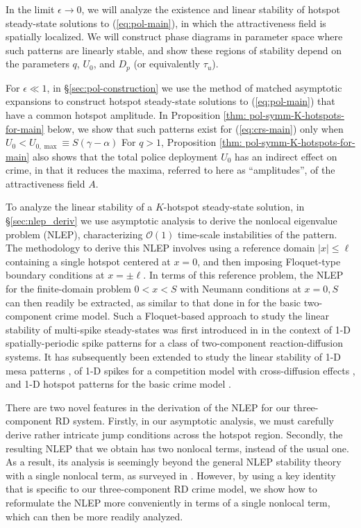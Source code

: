 \documentclass{article}%
\begin{document}
In the limit $\epsilon\to 0$, we will analyze the existence and
linear stability of hotspot steady-state solutions to
(\ref{eq:pol-main}), in which the attractiveness field is spatially
localized. We will construct phase diagrams in parameter space where
such patterns are linearly stable, and show these regions of stability
depend on the parameters $q$, $U_0$, and $D_p$ (or equivalently
$\tau_u$).

For $\epsilon\ll 1$, in \S \ref{sec:pol-construction} we use the
method of matched asymptotic expansions to construct hotspot
steady-state solutions to (\ref{eq:pol-main}) that have a common
hotspot amplitude. In Proposition \ref{thm:
  pol-symm-K-hotspots-for-main} below, we show that such patterns exist for
(\ref{eq:crs-main}) only when $U_0<U_{0,\max}\equiv S(\gamma-\alpha)$
For $q>1$, Proposition \ref{thm: pol-symm-K-hotspots-for-main} also shows
that the total police deployment $U_0$ has an indirect effect on
crime, in that it reduces the maxima, referred to here as
``amplitudes'', of the attractiveness field $A$.

To analyze the linear stability of a $K$-hotspot steady-state
solution, in \S \ref{sec:nlep_deriv} we use asymptotic analysis to
derive the nonlocal eigenvalue problem (NLEP), characterizing
${\mathcal O}(1)$ time-scale instabilities of the pattern. The
methodology to derive this NLEP involves using a reference domain
$|x|\leq \ell$ containing a single hotspot centered at $x=0$, and
then imposing Floquet-type boundary conditions at $x=\pm \ell$.  In
terms of this reference problem, the NLEP for the finite-domain
problem $0<x<S$ with Neumann conditions at $x=0,S$ can then readily be
extracted, as similar to that done in \cite{kww_crime} for the basic
two-component crime model.  Such a Floquet-based approach to study the
linear stability of multi-spike steady-states was first introduced in
\cite{floq-ref} in the context of 1-D spatially-periodic spike patterns
for a class of two-component reaction-diffusion systems. It has
subsequently been extended to study the linear stability of 1-D mesa
patterns \cite{mk_mesa}, of 1-D spikes for a competition model with
cross-diffusion effects \cite{kw_xdiff}, and 1-D hotspot patterns for
the basic crime model \cite{kww_crime}. 

There are two novel features in the derivation of the NLEP for our
three-component RD system. Firstly, in our asymptotic analysis, we
must carefully derive rather intricate jump conditions across the
hotspot region. Secondly, the resulting NLEP that we obtain has two
nonlocal terms, instead of the usual one. As a result, its analysis is
seemingly beyond the general NLEP stability theory with a single
nonlocal term, as surveyed in \cite{wei_rev}.  However, by using a
key identity that is specific to our three-component RD crime
model, we show how to reformulate the NLEP more conveniently in terms
of a single nonlocal term, which can then be more readily analyzed.
\end{document}

